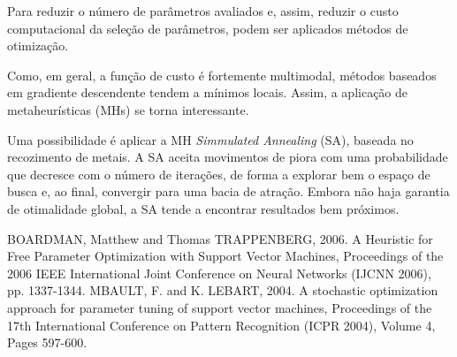 \documentclass[a4paper]{article}
\begin{document}
Para reduzir o número de parâmetros avaliados e, assim, reduzir o custo computacional da seleção de parâmetros, podem ser aplicados métodos de otimização.

Como, em geral, a função de custo é fortemente multimodal, métodos baseados em gradiente descendente tendem a mínimos locais. Assim, a aplicação de metaheurísticas (MHs) se torna interessante.

Uma possibilidade é aplicar a MH \textit{Simmulated Annealing} (SA), baseada no recozimento de metais. A SA aceita movimentos de piora com uma probabilidade que decresce com o número de iterações, de forma a explorar bem o espaço de busca e, ao final, convergir para uma bacia de atração. Embora não haja garantia de otimalidade global, a SA tende a encontrar resultados bem próximos.


\begin{thebibliography}{9}
 BOARDMAN, Matthew and Thomas TRAPPENBERG, 2006. A Heuristic for Free Parameter Optimization with Support Vector Machines, Proceedings of the 2006 IEEE International Joint Conference on Neural Networks (IJCNN 2006), pp. 1337-1344.
 MBAULT, F. and K. LEBART, 2004. A stochastic optimization approach for parameter tuning of support vector machines, Proceedings of the 17th International Conference on Pattern Recognition (ICPR 2004), Volume 4, Pages 597-600.
\end{thebibliography}
\end{document}
